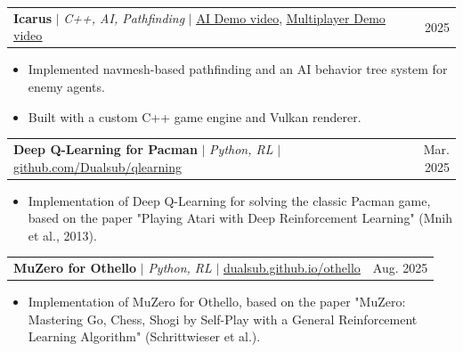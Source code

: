 \documentclass[a4paper,11pt]{article}
\makeatletter
\newcommand{\resumeItem}[1]{
  \item\small{
    {#1 \vspace{-2pt}}
  }
}
\newcommand{\resumeProjectHeading}[2]{
    \item
    \begin{tabular*}{0.97\textwidth}{l@{\extracolsep{\fill}}r}
      \small#1 & #2 \\
    \end{tabular*}\vspace{-7pt}
}
\newcommand{\resumeItemListStart}{\begin{itemize}}
\newcommand{\resumeItemListEnd}{\end{itemize}\vspace{-5pt}}
\makeatother
\begin{document}
\resumeProjectHeading
{\textbf{Icarus} $|$ \emph{C++, AI, Pathfinding} $|$ \href{https://youtu.be/I_DFSRGVTBE}{\underline{AI Demo video}}, \href{https://streamable.com/kr6nop}{\underline{Multiplayer Demo video}}}{2025}
\resumeItemListStart
\resumeItem{Implemented navmesh-based pathfinding and an AI behavior tree system for enemy agents.}
\resumeItem{Built with a custom C++ game engine and Vulkan renderer.}
\resumeItemListEnd





\resumeProjectHeading
{\textbf{Deep Q-Learning for Pacman} $|$ \emph{Python, RL} $|$ \href{https://github.com/Dualsub/qlearning}{\underline{github.com/Dualsub/qlearning}}}{Mar. 2025}
\resumeItemListStart
\resumeItem{Implementation of Deep Q-Learning for solving the classic Pacman game, based on the paper "Playing Atari with Deep Reinforcement Learning" (Mnih et al., 2013).}
\resumeItemListEnd

\resumeProjectHeading
{\textbf{MuZero for Othello} $|$ \emph{Python, RL} $|$ \href{https://dualsub.github.io/othello/}{\underline{dualsub.github.io/othello}}}{Aug. 2025}
\resumeItemListStart
\resumeItem{Implementation of MuZero for Othello, based on the paper "MuZero: Mastering Go, Chess, Shogi by Self-Play with a General Reinforcement Learning Algorithm" (Schrittwieser et al.).}
\resumeItemListEnd
\end{document}

